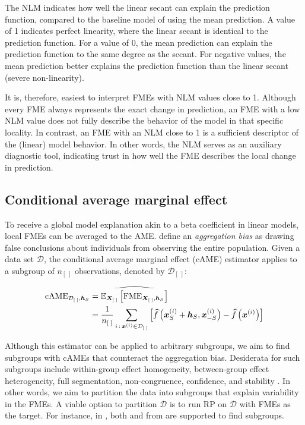 The NLM indicates how well the linear secant can explain the prediction function, compared to the baseline model of using the mean prediction. A value of 1 indicates perfect linearity, where the linear secant is identical to the prediction function. For a value of 0, the mean prediction can explain the prediction function to the same degree as the secant. For negative values, the mean prediction better explains the prediction function than the linear secant (severe non-linearity).
\par
It is, therefore, easiest to interpret FMEs with NLM values close to 1. Although every FME always represents the exact change in prediction, an FME with a low NLM value does not fully describe the behavior of the model in that specific locality. In contrast, an FME with an NLM close to 1 is a sufficient descriptor of the (linear) model behavior. In other words, the NLM serves as an auxiliary diagnostic tool, indicating trust in how well the FME describes the local change in prediction.


\subsection{Conditional average marginal effect}

To receive a global model explanation akin to a beta coefficient in linear models, local FMEs can be averaged to the AME. \cite{mehrabi_survey_bias} define an \textit{aggregation bias} as drawing false conclusions about individuals from observing the entire population.
Given a data set $\mathcal{D}$, the conditional average marginal effect (cAME) estimator applies to a subgroup of $n_{[\;]}$ observations, denoted by $\mathcal{D}_{[\;]}$:

\begin{align}
    \text{cAME}_{\mathcal{D}_{[\;]}, \bm{h}_{S}} &= \widehat{\mathbb{E}_{\bm{X}_{[\;]}} \left[\text{FME}_{\bm{X}_{[\;]}, \bm{h}_{S}} \right]} \nonumber \\
    &= \frac{1}{n_{[\;]}} \sum_{i \,:\, \bm{x}^{(i)} \in \mathcal{D}_{[\;]}} \left[\widehat{f}\left(\bm{x}_{S}^{(i)} + \bm{h}_{S}, \bm{x}_{-S}^{(i)}\right) - \widehat{f}\left(\bm{x}^{(i)}\right) \right] 
    \label{eq:came}
\end{align}

Although this estimator can be applied to arbitrary subgroups, we aim to find subgroups with cAMEs that counteract the aggregation bias.
Desiderata for such subgroups include within-group effect homogeneity, between-group effect heterogeneity, full segmentation, non-congruence, confidence, and stability \citep{scholbeck_fme}. In other words, we aim to partition the data into subgroups that explain variability in the FMEs. A viable option to partition $\mathcal{D}$ is to run RP on $\mathcal{D}$ with FMEs as the target. For instance, in , both  \citep{rpart} and  from  \citep{partykit} are supported to find subgroups. 


